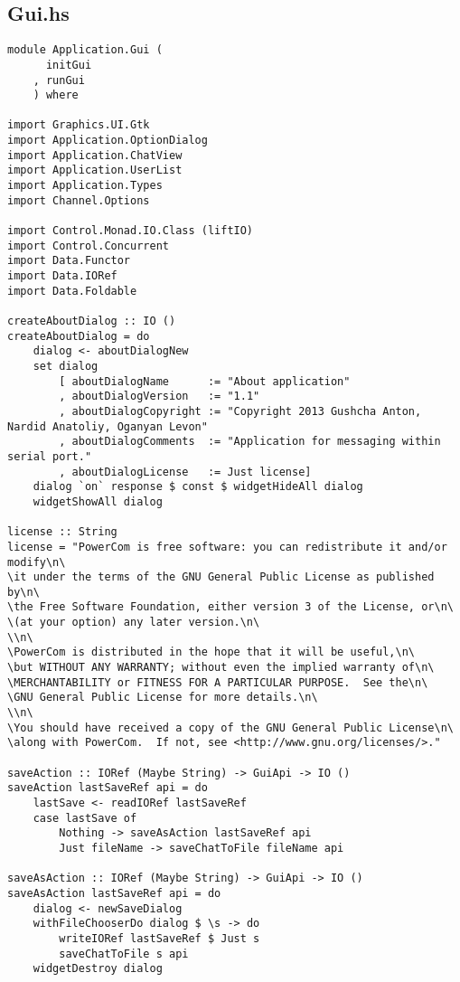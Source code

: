 \documentclass[russian,utf8,simple,emptystyle]{eskdtext}
\begin{document}
\subsection{Gui.hs}
\begin{lstlisting}
module Application.Gui (
      initGui
    , runGui
    ) where

import Graphics.UI.Gtk
import Application.OptionDialog
import Application.ChatView
import Application.UserList
import Application.Types
import Channel.Options

import Control.Monad.IO.Class (liftIO)
import Control.Concurrent
import Data.Functor
import Data.IORef
import Data.Foldable 

createAboutDialog :: IO ()
createAboutDialog = do
    dialog <- aboutDialogNew 
    set dialog 
        [ aboutDialogName      := "About application"
        , aboutDialogVersion   := "1.1"
        , aboutDialogCopyright := "Copyright 2013 Gushcha Anton, Nardid Anatoliy, Oganyan Levon"
        , aboutDialogComments  := "Application for messaging within serial port."
        , aboutDialogLicense   := Just license]
    dialog `on` response $ const $ widgetHideAll dialog 
    widgetShowAll dialog

license :: String
license = "PowerCom is free software: you can redistribute it and/or modify\n\
\it under the terms of the GNU General Public License as published by\n\
\the Free Software Foundation, either version 3 of the License, or\n\
\(at your option) any later version.\n\
\\n\
\PowerCom is distributed in the hope that it will be useful,\n\
\but WITHOUT ANY WARRANTY; without even the implied warranty of\n\
\MERCHANTABILITY or FITNESS FOR A PARTICULAR PURPOSE.  See the\n\
\GNU General Public License for more details.\n\
\\n\
\You should have received a copy of the GNU General Public License\n\
\along with PowerCom.  If not, see <http://www.gnu.org/licenses/>."

saveAction :: IORef (Maybe String) -> GuiApi -> IO ()
saveAction lastSaveRef api = do 
    lastSave <- readIORef lastSaveRef 
    case lastSave of 
        Nothing -> saveAsAction lastSaveRef api   
        Just fileName -> saveChatToFile fileName api 

saveAsAction :: IORef (Maybe String) -> GuiApi -> IO ()
saveAsAction lastSaveRef api = do 
    dialog <- newSaveDialog
    withFileChooserDo dialog $ \s -> do 
        writeIORef lastSaveRef $ Just s 
        saveChatToFile s api
    widgetDestroy dialog 


\end{lstlisting}
\end{document}
